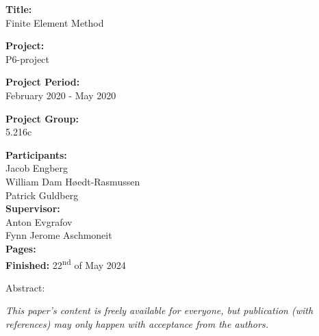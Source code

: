 \begin{minipage}[t]{0.48\textwidth}
\textbf{Title:} \\[5pt]\hspace{2ex}
{Finite Element Method}
\bigskip

\textbf{Project:} \\[5pt]\hspace{2ex}
P6-project
\bigskip

\textbf{Project Period:} \\[5pt]\hspace{2ex}
February 2020 - May 2020
\bigskip

\textbf{Project Group:} \\[5pt]\hspace{2ex}
5.216c
\bigskip

\textbf{Participants:} \\ [5pt]\hspace{2ex}%
Jacob Engberg \\%
William Dam Høedt-Rasmussen\\%
Patrick Guldberg \\%

\textbf{Supervisor:} \\ [5pt]\hspace{2ex}%
Anton Evgrafov \\
Fynn Jerome Aschmoneit \\

\textbf{Pages: \pageref{LastPage}} \\ [5pt]\hspace{2ex}
\textbf{Finished:} 22\textsuperscript{nd} of May 2024

\end{minipage}
\hfill
\begin{minipage}[t]{0.48\textwidth}
Abstract: \\[5pt]
\fbox{\parbox{6.8cm}{\bigskip}}
\end{minipage}
\hspace*{4ex}

\vfill

{\footnotesize \textit{This paper's content is freely available for everyone, but publication (with references) may only happen with acceptance from the authors.}}